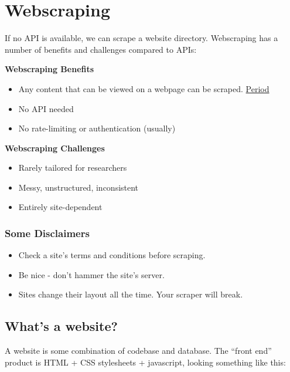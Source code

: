 \documentclass[]{book}
\providecommand{\tightlist}{%
  \setlength{\itemsep}{0pt}\setlength{\parskip}{0pt}}
\begin{document}
\hypertarget{webscraping}{%
\section{Webscraping}\label{webscraping}}

If no API is available, we can scrape a website directory. Webscraping has a number of benefits and challenges compared to APIs:

\textbf{Webscraping Benefits}

\begin{itemize}
\tightlist
\item
  Any content that can be viewed on a webpage can be scraped. \href{https://blog.hartleybrody.com/web-scraping/}{Period}
\item
  No API needed
\item
  No rate-limiting or authentication (usually)
\end{itemize}

\textbf{Webscraping Challenges}

\begin{itemize}
\tightlist
\item
  Rarely tailored for researchers
\item
  Messy, unstructured, inconsistent
\item
  Entirely site-dependent
\end{itemize}

\hypertarget{some-disclaimers}{%
\subsubsection*{Some Disclaimers}\label{some-disclaimers}}

\begin{itemize}
\tightlist
\item
  Check a site's terms and conditions before scraping.
\item
  Be nice - don't hammer the site's server.
\item
  Sites change their layout all the time. Your scraper will break.
\end{itemize}

\hypertarget{whats-a-website}{%
\subsection{What's a website?}\label{whats-a-website}}

A website is some combination of codebase and database. The ``front end'' product is HTML + CSS stylesheets + javascript, looking something like this:
\end{document}
